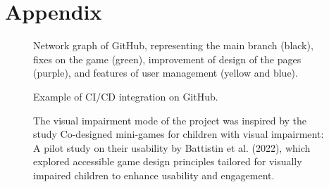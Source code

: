 
\chapter{Appendix}
\begin{appendices}

    \begin{figure}[H]
        \caption*{Network graph of GitHub, representing the main branch (black), fixes on the game (green), improvement of design of the pages (purple), and features of user management (yellow and blue).}
        \label{fig:network-grahp}
    \end{figure}
    \begin{figure}[H]
        \caption*{Example of CI/CD integration on GitHub.}
        \label{fig:ci-cd}
    \end{figure}
    \begin{figure}[H]
        \caption*{The visual impairment mode of the project was inspired by the study Co-designed mini-games for children with visual impairment: A pilot study on their usability by Battistin et al. (2022), which explored accessible game design principles tailored for visually impaired children to enhance usability and engagement.}
        \label{fig:impairment}
    \end{figure}
\end{appendices}